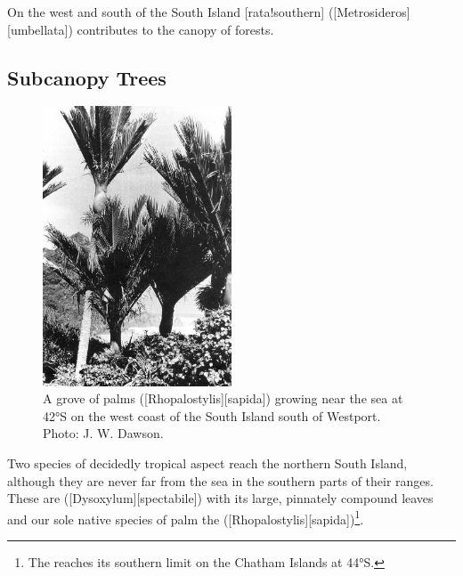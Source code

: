 On the west and south of the South Island [rata!southern] ([Metrosideros][umbellata]) contributes to the canopy of  forests.

\subsection{Subcanopy Trees}

\begin{figure}
	\includegraphics[width=0.5\textwidth]{graphics/figure60nikau.jpg}
	\centering
	\caption[A grove of nikau palms]{A grove of  palms ([Rhopalostylis][sapida]) growing near the sea at \ang{42}S on the west coast of the South Island south of Westport. Photo:  J. W. Dawson.}%
	\label{fig:60nikau}
\end{figure}

Two species of decidedly tropical aspect reach the northern South Island, although they are never far from the sea in the southern parts of their ranges.
These are  ([Dysoxylum][spectabile]) with its large, pinnately compound leaves and our sole native species of palm the  ([Rhopalostylis][sapida])\footnote{The  reaches its southern limit on the Chatham Islands at \ang{44}S.}.

